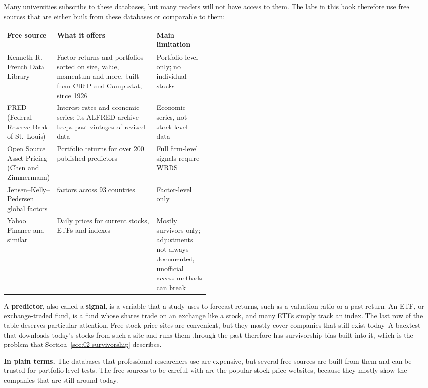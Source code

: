 Many universities subscribe to these databases, but many readers will not have access to them. The labs in this book therefore use free sources that are either built from these databases or comparable to them:

\begin{center}
\small
\begin{tabularx}{0.9\linewidth}{@{}>{\raggedright\arraybackslash}p{0.22\linewidth}>{\raggedright\arraybackslash}X>{\raggedright\arraybackslash}p{0.26\linewidth}@{}}
\toprule
Free source & What it offers & Main limitation \\
\midrule
Kenneth R. French Data Library & Factor returns and portfolios sorted on size, value, momentum and more, built from CRSP and Compustat, since 1926 & Portfolio-level only; no individual stocks \\
FRED (Federal Reserve Bank of St.\ Louis) & Interest rates and economic series; its ALFRED archive keeps past vintages of revised data & Economic series, not stock-level data \\
Open Source Asset Pricing (Chen and Zimmermann) & Portfolio returns for over 200 published predictors & Full firm-level signals require WRDS \\
Jensen--Kelly--Pedersen global factors & 153 factors across 93 countries & Factor-level only \\
Yahoo Finance and similar & Daily prices for current stocks, ETFs and indexes & Mostly survivors only; adjustments not always documented; unofficial access methods can break \\
\bottomrule
\end{tabularx}
\end{center}

A \textbf{predictor}, also called a \textbf{signal}, is a variable that a study uses to forecast returns, such as a valuation ratio or a past return. An ETF, or exchange-traded fund, is a fund whose shares trade on an exchange like a stock, and many ETFs simply track an index. The last row of the table deserves particular attention. Free stock-price sites are convenient, but they mostly cover companies that still exist today. A backtest that downloads today's stocks from such a site and runs them through the past therefore has survivorship bias built into it, which is the problem that Section~\ref{sec:02-survivorship} describes.

\noindent\textbf{In plain terms.} The databases that professional researchers use are expensive, but several free sources are built from them and can be trusted for portfolio-level tests. The free sources to be careful with are the popular stock-price websites, because they mostly show the companies that are still around today.

